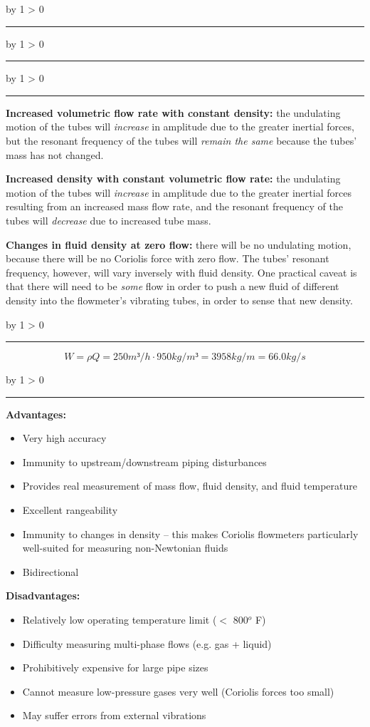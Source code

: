 \documentclass[12pt,a4paper]{article}
\def\svar{
           \advance\answnum by 1
           \ifnum \answnum > 0
                \hrule
                \vskip 3pt
                \leftline{Svar \the\answnum}
                \vskip 3pt \fi}
\begin{document}
\vskip 10pt \filbreak 
\svar{} 


\vskip 10pt \filbreak 
\svar{} 


\vskip 10pt \filbreak 
\svar{} 

{\bf Increased volumetric flow rate with constant density:} the undulating motion of the tubes will {\it increase} in amplitude due to the greater inertial forces, but the resonant frequency of the tubes will {\it remain the same} because the tubes' mass has not changed.

\vskip 10pt

{\bf Increased density with constant volumetric flow rate:} the undulating motion of the tubes will {\it increase} in amplitude due to the greater inertial forces resulting from an increased mass flow rate, and the resonant frequency of the tubes will {\it decrease} due to increased tube mass.

\vskip 10pt

{\bf Changes in fluid density at zero flow:} there will be no undulating motion, because there will be no Coriolis force with zero flow.  The tubes' resonant frequency, however, will vary inversely with fluid density.  One practical caveat is that there will need to be {\it some} flow in order to push a new fluid of different density into the flowmeter's vibrating tubes, in order to sense that new density.

\vskip 10pt \filbreak 
\svar{} 
$$ W=\rho Q=250m³/h \cdot 950 kg/m³=3958 kg/m=66.0 kg/s $$

\vskip 10pt \filbreak 
\svar{} 

{\bf Advantages:}

\begin{itemize}
\item{} Very high accuracy
\item{} Immunity to upstream/downstream piping disturbances
\item{} Provides real measurement of mass flow, fluid density, and fluid temperature
\item{} Excellent rangeability
\item{} Immunity to changes in density -- this makes Coriolis flowmeters particularly well-suited for measuring non-Newtonian fluids
\item{} Bidirectional
\end{itemize}

\vskip 10pt

{\bf Disadvantages:}

\begin{itemize}
\item{} Relatively low operating temperature limit ($<$ 800$^{o}$ F)
\item{} Difficulty measuring multi-phase flows (e.g. gas + liquid)
\item{} Prohibitively expensive for large pipe sizes
\item{} Cannot measure low-pressure gases very well (Coriolis forces too small)
\item{} May suffer errors from external vibrations
\end{itemize}
\end{document}
